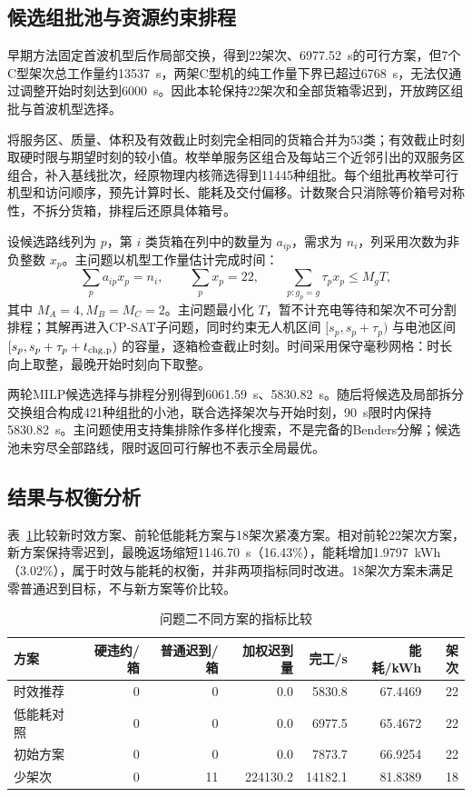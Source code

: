 \subsection{候选组批池与资源约束排程}

早期方法固定首波机型后作局部交换，得到22架次、6977.52~s的可行方案，但7个C型架次总工作量约13537~s，两架C型机的纯工作量下界已超过6768~s，无法仅通过调整开始时刻达到6000~s。因此本轮保持22架次和全部货箱零迟到，开放跨区组批与首波机型选择。

将服务区、质量、体积及有效截止时刻完全相同的货箱合并为53类；有效截止时刻取硬时限与期望时刻的较小值。枚举单服务区组合及每站三个近邻引出的双服务区组合，补入基线批次，经原物理内核筛选得到11445种组批。每个组批再枚举可行机型和访问顺序，预先计算时长、能耗及交付偏移。计数聚合只消除等价箱号对称性，不拆分货箱，排程后还原具体箱号。

设候选路线列为 $p$，第 $i$ 类货箱在列中的数量为 $a_{ip}$，需求为 $n_i$，列采用次数为非负整数 $x_p$。主问题以机型工作量估计完成时间：
\[
\sum_p a_{ip}x_p=n_i,\qquad \sum_p x_p=22,\qquad
\sum_{p:g_p=g}\tau_p x_p\leq M_g T,
\]
其中 $M_A=4,M_B=M_C=2$。主问题最小化 $T$，暂不计充电等待和架次不可分割排程；其解再进入CP-SAT子问题，同时约束无人机区间 $[s_p,s_p+\tau_p)$ 与电池区间 $[s_p,s_p+\tau_p+t_{\rm chg,p})$ 的容量，逐箱检查截止时刻。时间采用保守毫秒网格：时长向上取整，最晚开始时刻向下取整。

两轮MILP候选选择与排程分别得到6061.59~s、5830.82~s。随后将候选及局部拆分交换组合构成421种组批的小池，联合选择架次与开始时刻，90~s限时内保持5830.82~s。主问题使用支持集排除作多样化搜索，不是完备的Benders分解；候选池未穷尽全部路线，限时返回可行解也不表示全局最优。

\subsection{结果与权衡分析}

表~\ref{tab:q2-pareto}比较新时效方案、前轮低能耗方案与18架次紧凑方案。相对前轮22架次方案，新方案保持零迟到，最晚返场缩短1146.70~s（16.43\%），能耗增加1.9797~kWh（3.02\%），属于时效与能耗的权衡，并非两项指标同时改进。18架次方案未满足零普通迟到目标，不与新方案等价比较。

\begin{table}[htbp]
\centering
\caption{问题二不同方案的指标比较}
\label{tab:q2-pareto}
\small
\begin{tabular}{lrrrrrr}
\toprule
方案 & 硬违约/箱 & 普通迟到/箱 & 加权迟到量 & 完工/s & 能耗/kWh & 架次\\
\midrule
时效推荐 & 0 & 0 & 0.0 & 5830.8 & 67.4469 & 22\\
低能耗对照 & 0 & 0 & 0.0 & 6977.5 & 65.4672 & 22\\
初始方案 & 0 & 0 & 0.0 & 7873.7 & 66.9254 & 22\\
少架次 & 0 & 11 & 224130.2 & 14182.1 & 81.8389 & 18\\
\bottomrule
\end{tabular}
\end{table}

